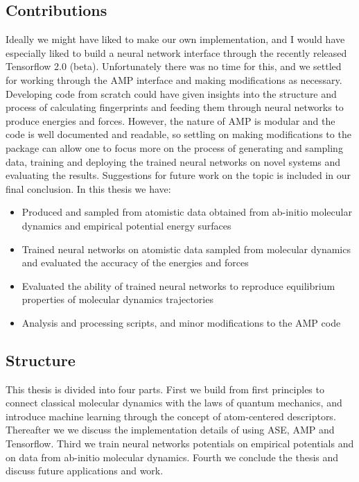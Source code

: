 \subsection{Contributions}
Ideally we might have liked to make our own implementation,
and I would have especially liked to build a neural network interface
through the recently released Tensorflow 2.0 (beta). Unfortunately there
was no time for this, and we settled for working through the AMP interface
and making modifications as necessary. 
Developing code from scratch could have given insights into the structure
and process of calculating fingerprints and feeding them through neural
networks to produce energies and forces. However, the nature of AMP
is modular and the code is well documented and readable, so 
settling on making modifications to the package can allow one to focus
more on the process of generating and sampling data, training and
deploying the trained neural networks on novel systems and evaluating the results.
Suggestions for future work on the topic
is included in our final conclusion.
In this thesis we have:

\begin{itemize}
    \item Produced and sampled from atomistic data obtained from ab-initio
        molecular dynamics and empirical potential energy surfaces
    \item Trained neural networks on atomistic data sampled from
        molecular dynamics and evaluated the accuracy of the energies
        and forces
    \item Evaluated the ability of trained neural networks to reproduce
        equilibrium properties of molecular dynamics trajectories
    \item Analysis and processing scripts, and minor modifications
        to the AMP code
\end{itemize}

\subsection{Structure}
This thesis is divided into four parts. First we build from first principles
to connect classical molecular dynamics with the laws of quantum mechanics,
and introduce machine learning through the concept of atom-centered descriptors.
Thereafter we we discuss the implementation details of using
ASE, AMP and Tensorflow. Third we train neural networks potentials
on empirical potentials and on data from ab-initio molecular dynamics.
Fourth we conclude the thesis and discuss future applications and work.
